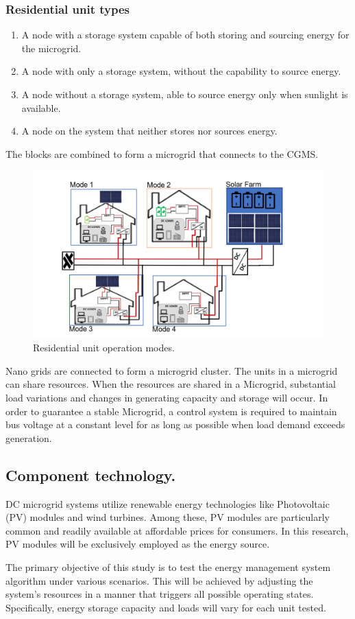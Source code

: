 \subsubsection{Residential unit types}
\begin{enumerate}[nolistsep]
	\item A node with a storage system capable of both storing and sourcing energy for the microgrid.
	\item A node with only a storage system, without the capability to source energy.
	\item A node without a storage system, able to source energy only when sunlight is available.
	\item A node on the system that neither stores nor sources energy.
\end{enumerate}

The blocks are combined to form a microgrid that connects to the CGMS.
\begin{figure}[H]
	\centering
	\includegraphics[totalheight=8cm]{Figures/re dc mg.png}
	\caption{Residential unit operation modes.}
\end{figure}
Nano grids are connected to form a microgrid cluster. The units in a microgrid can share resources. When the resources are shared in a Microgrid, substantial load variations and changes in generating capacity and storage will occur. In order to guarantee a stable Microgrid, a control system is required to maintain bus voltage at a constant level for as long as possible when load demand exceeds generation.

\subsection{Component technology.}
DC microgrid systems utilize renewable energy technologies like Photovoltaic (PV) modules and wind turbines. Among these, PV modules are particularly common and readily available at affordable prices for consumers. In this research, PV modules will be exclusively employed as the energy source.\par
The primary objective of this study is to test the energy management system algorithm under various scenarios. This will be achieved by adjusting the system's resources in a manner that triggers all possible operating states. Specifically, energy storage capacity and loads will vary for each unit tested.\par

